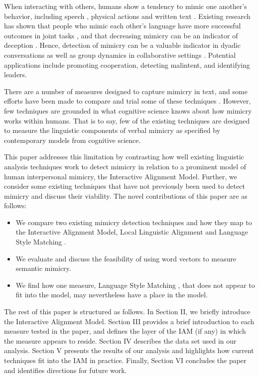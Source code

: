 \documentclass[conference]{IEEEtran}
\begin{document}
When interacting with others, humans show a tendency to mimic one another's behavior, including speech \cite{levelt1982surface, bock1986syntactic, bock1989closed, garrod1987saying}, physical actions \cite{bernieri1988coordinated} and written text \cite{danescu2011chameleons, scissors2008linguistic}. Existing research has shown that people who mimic each other's language have more successful outcomes in joint tasks \cite{richardson2014language}, and that decreasing mimicry can be an indicator of deception \cite{taylor2013detecting}. Hence, detection of mimicry can be a valuable indicator in dyadic conversations as well as group dynamics in collaborative settings \cite{scissors2009cmc}. Potential applications include promoting cooperation, detecting malintent, and identifying leaders.

There are a number of measures designed to capture mimicry in text, and some efforts have been made to compare and trial some of these techniques \cite{xu2015evaluation}. However, few techniques are grounded in what cognitive science knows about how mimicry works within humans. That is to say, few of the existing techniques are designed to measure the linguistic components of verbal mimicry as specified by contemporary models from cognitive science.

This paper addresses this limitation by contrasting how well existing linguistic analysis techniques work to detect mimicry in relation to a prominent model of human interpersonal mimicry, the Interactive Alignment Model. Further, we consider some existing techniques that have not previously been used to detect mimicry and discuss their viability. The novel contributions of this paper are as follows:
\begin{itemize}
	\item We compare two existing mimicry detection techniques and how they map to the Interactive Alignment Model, Local Linguistic Alignment \cite{wang2014linguistic} and Language Style Matching \cite{ireland2010language}.
	\item  We evaluate and discuss the feasibility of using word vectors \cite{mikolov2013efficient} to measure semantic mimicry.
	\item We find how one measure, Language Style Matching \cite{ireland2010language}, that does not appear to fit into the model, may nevertheless have a place in the model.
\end{itemize}

The rest of this paper is structured as follows. In Section II, we briefly introduce the Interactive Alignment Model. Section III provides a brief introduction to each measure tested in the paper, and defines the layer of the IAM (if any) in which the measure appears to reside. Section IV describes the data set used in our analysis. Section V presents the results of our analysis and highlights how current techniques fit into the IAM in practice. Finally, Section VI concludes the paper and identifies directions for future work.
\end{document}
